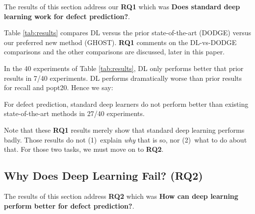 \documentclass[10pt,compsoc,twocolumn]{IEEEtran}
\begin{document}
The results of this section address our {\bf RQ1} which was 
{\bf Does standard deep learning work for defect prediction?}.



Table \ref{tab:results} compares DL versus the prior state-of-the-art (DODGE) versus
our preferred new method (GHOST). {\bf RQ1} comments on the DL-vs-DODGE comparisons and the other comparisons are discussed, later in this paper.

 
In the 40 experiments of   Table \ref{tab:results}, DL only  performs  better that prior results in 7/40 experiments. DL performs dramatically worse  than prior results for recall and popt20. 
Hence we say:


\begin{blockquote}
    \noindent
    For defect prediction, standard deep learners do not perform better than existing state-of-the-art methods in 27/40 experiments.
\end{blockquote}

Note that these {\bf RQ1} results merely show that standard deep learning performs badly.
Those results do not (1)~explain {\em why} that is so, nor (2)~what to do about that. For those two tasks,
we must move on to {\bf RQ2}.

\subsection{Why Does Deep Learning Fail? ({\bf RQ2})}
\label{sec:rq2}
The results of this section address   {\bf RQ2} which was 
{\bf How can deep learning perform better for defect prediction?}.
\end{document}
